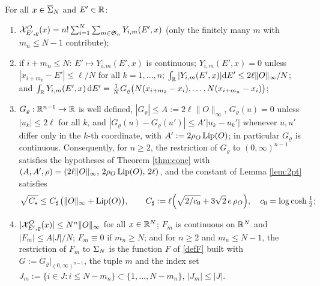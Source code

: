\begin{lemma}\label{lem:alg}
For all $x\in\overline{\Sigma}_N$ and $E'\in\mathbb{R}$:
\begin{enumerate}[label=(\alph*),itemsep=1pt]
\item $\mathcal{X}^O_{E',\varrho}(x)=n!\sum_{i=1}^N\sum_{m\in\mathfrak S_n}Y_{i,m}(E',x)$ (only the finitely many $m$ with $m_n\le N-1$ contribute);
\item if $i+m_n\le N$: $E'\mapsto Y_{i,m}(E',x)$ is continuous; $Y_{i,m}(E',x)=0$ unless $|x_{i+m_k}-E'|\le\ell/N$ for all $k=1,\dots,n$; $\int_{\mathbb{R}}|Y_{i,m}(E',x)|\mathrm{d} E'\le2\ell\|O\|_\infty/N$; and
$\int_{\mathbb{R}} Y_{i,m}(E',x)\,\mathrm{d} E'=\frac1NG_\varrho\big(N(x_{i+m_2}-x_i),\dots,N(x_{i+m_n}-x_i)\big)$;
\item $G_\varrho:\mathbb{R}^{n-1}\to\mathbb{R}$ is well defined, $|G_\varrho|\le A:=2\ell\|O\|_\infty$, $G_\varrho(u)=0$ unless $|u_k|\le2\ell$ for all $k$, and $|G_\varrho(u)-G_\varrho(u')|\le A'|u_k-u_k'|$ whenever $u,u'$ differ only in the $k$-th coordinate, with $A':=2\rho_O\operatorname{Lip}(O)$; in particular $G_\varrho$ is continuous.
Consequently, for $n\ge2$, the restriction of $G_\varrho$ to $(0,\infty)^{n-1}$ satisfies the hypotheses of Theorem \ref{thm:conc} with $(A,A',\rho)=(2\ell\|O\|_\infty,\,2\rho_O\operatorname{Lip}(O),\,2\ell)$, and the constant of Lemma \ref{lem:2pt} satisfies
\begin{equation}\label{c8:Cstar}
\sqrt{C_\star}\le C_\sharp\,\big(\|O\|_\infty+\operatorname{Lip}(O)\big),\qquad C_\sharp:=\ell\Big(\sqrt{2/c_0}+3\sqrt2\,e\,\rho_O\Big),\quad c_0=\log\cosh\tfrac12 ;
\end{equation}
\item $|\mathcal{X}^O_{E',\varrho}(x)|\le N^n\|O\|_\infty$ for all $x\in\mathbb{R}^N$; $F_m$ is continuous on $\mathbb{R}^N$ and $|F_m|\le A|J|/N$; $F_m\equiv0$ if $m_n\ge N$; and for $n\ge2$ and $m_n\le N-1$, the restriction of $F_m$ to $\Sigma_N$ is the function $F$ of \eqref{defF} built with $G:=G_\varrho|_{(0,\infty)^{n-1}}$, the tuple $m$ and the index set $J_m:=\{i\in J:i\le N-m_n\}\subset\{1,\dots,N-m_n\}$, $|J_m|\le|J|$.
\end{enumerate}
\end{lemma}

